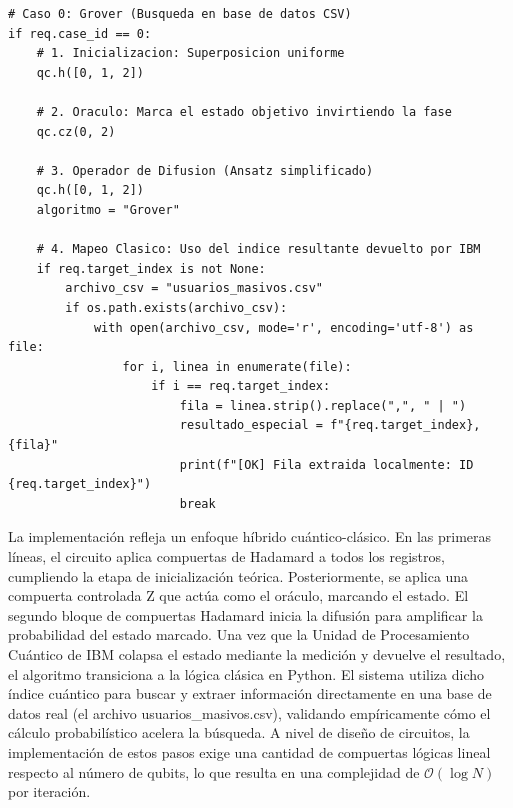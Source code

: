 \documentclass[12pt,a4paper]{article}
\begin{document}
\begin{lstlisting}[caption={Ansatz de Grover y extracción híbrida en Python}]
# Caso 0: Grover (Busqueda en base de datos CSV)
if req.case_id == 0:
    # 1. Inicializacion: Superposicion uniforme
    qc.h([0, 1, 2])
    
    # 2. Oraculo: Marca el estado objetivo invirtiendo la fase
    qc.cz(0, 2)
    
    # 3. Operador de Difusion (Ansatz simplificado)
    qc.h([0, 1, 2])
    algoritmo = "Grover"
    
    # 4. Mapeo Clasico: Uso del indice resultante devuelto por IBM
    if req.target_index is not None:
        archivo_csv = "usuarios_masivos.csv" 
        if os.path.exists(archivo_csv):
            with open(archivo_csv, mode='r', encoding='utf-8') as file:
                for i, linea in enumerate(file):
                    if i == req.target_index:
                        fila = linea.strip().replace(",", " | ")
                        resultado_especial = f"{req.target_index}, {fila}"
                        print(f"[OK] Fila extraida localmente: ID {req.target_index}")
                        break
\end{lstlisting}

La implementación refleja un enfoque híbrido cuántico-clásico. En las primeras líneas, el circuito aplica compuertas de Hadamard a todos los registros, cumpliendo la etapa de inicialización teórica. Posteriormente, se aplica una compuerta controlada Z que actúa como el oráculo, marcando el estado. El segundo bloque de compuertas Hadamard inicia la difusión para amplificar la probabilidad del estado marcado. Una vez que la Unidad de Procesamiento Cuántico de IBM colapsa el estado mediante la medición y devuelve el resultado, el algoritmo transiciona a la lógica clásica en Python. El sistema utiliza dicho índice cuántico para buscar y extraer información directamente en una base de datos real (el archivo usuarios\_masivos.csv), validando empíricamente cómo el cálculo probabilístico acelera la búsqueda. A nivel de diseño de circuitos, la implementación de estos pasos exige una cantidad de compuertas lógicas lineal respecto al número de qubits, lo que resulta en una complejidad de $\mathcal{O}(\log N)$ por iteración.\\
\end{document}
